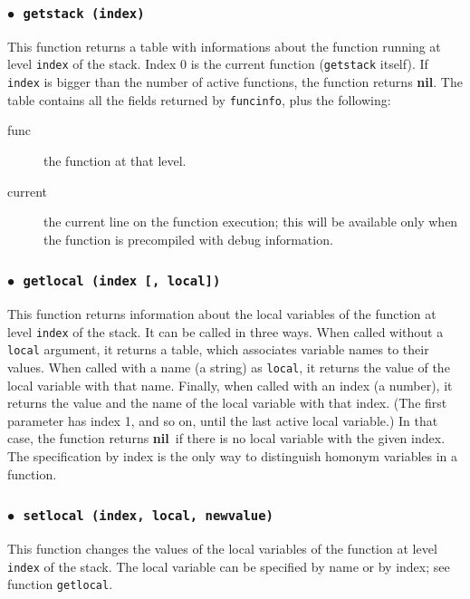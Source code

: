 \documentclass[11pt]{article}
\newcommand{\T}[1]{{\tt #1}}
\newcommand{\nil}{{\bf nil}}
\newcommand{\Deffunc}[1]{\index{#1}}
\newcommand{\ff}{$\bullet$\ }
\begin{document}
\subsubsection*{\ff \T{getstack (index)}}\Deffunc{getstack}

This function returns a table with informations about the function
running at level \verb|index| of the stack.
Index 0 is the current function (\verb|getstack| itself).
If \verb|index| is bigger than the number of active functions,
the function returns \nil.
The table contains all the fields returned by \verb|funcinfo|,
plus the following:
\begin{description}
\item[func] the function at that level.
\item[current] the current line on the function execution;
this will be available only when the function is
precompiled with debug information.
\end{description}

\subsubsection*{\ff \T{getlocal (index [, local])}}\Deffunc{getlocal}

This function returns information about the local variables of the
function at level \verb|index| of the stack.
It can be called in three ways.
When called without a \verb|local| argument,
it returns a table, which associates variable names to their values.
When called with a name (a string) as \verb|local|,
it returns the value of the local variable with that name.
Finally, when called with an index (a number),
it returns the value and the name of the local variable
with that index.
(The first parameter has index 1, and so on,
until the last active local variable.)
In that case, the function returns \nil\ if there is no local
variable with the given index.
The specification by index is the only way to distinguish
homonym variables in a function.

\subsubsection*{\ff \T{setlocal (index, local, newvalue)}}\Deffunc{setlocal}

This function changes the values of  the local variables of the
function at level \verb|index| of the stack.
The local variable can be specified by name or by index;
see function \verb|getlocal|.
\end{document}
